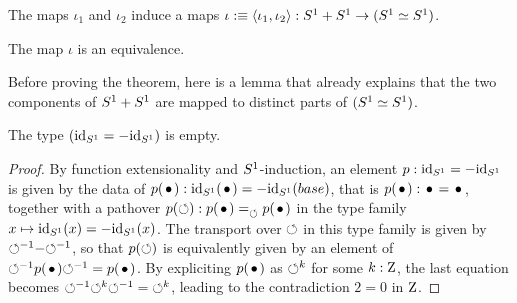 \documentclass[english,a4paper]{tufte-handout}
\begin{document}
The maps $\iota_1$ and $\iota_2$ induce a maps
$\iota \mathrel{\hbox{:}\mkern-5mu\equiv} \langle\iota_1,\iota_2\rangle : {S^1} + {S^1} \to ({S^1}\simeq
{S^1})$.
\begin{theorem*}
  The map $\iota$ is an equivalence.
\end{theorem*}
%
Before proving the theorem, here is a lemma that already explains that
the two components of ${S^1}+{S^1}$ are mapped to distinct parts of
$({S^1} \simeq {S^1})$.
\begin{lemma}
  \label{lemma:id-not-equal-oppid}%
  The type $(\mathord{\mathrm{id}}_{S^1} = -\mathord{\mathrm{id}}_{S^1})$ is empty.
\end{lemma}
\begin{proof}
  By function extensionality and ${S^1}$-induction, an element
  $p : \mathord{\mathrm{id}}_{S^1} = -\mathord{\mathrm{id}}_{S^1}$ is given by the data of
  $p(\base) : \id_\Sc(\base) = -\id_\Sc(base)$, that is
  $p(\base):\base=\base$, together with a pathover
  $p(\Sloop): \pathover {p(\base)} {} \Sloop {p(\base)}$ in the type
  family $x\mapsto \mathord{\mathrm{id}}_{S^1} (x)=-\mathord{\mathrm{id}}_{S^1} (x)$. The transport over
  $\mathord{\circlearrowleft}$ in this type family is given by
  ${\mathord{\circlearrowleft}}^{-1}\mathord{-}{\mathord{\circlearrowleft}}^{-1}$, so that $p(\mathord{\circlearrowleft})$ is equivalently
  given by an element of $\inv\Sloop p(\base) \inv\Sloop =
  p(\base)$. By expliciting $p(\base)$ as $\mathord{\circlearrowleft}^k$ for some
  $k:\mathrm{Z}$, the last equation becomes
  ${\mathord{\circlearrowleft}}^{-1} \mathord{\circlearrowleft}^k {\mathord{\circlearrowleft}}^{-1} = \mathord{\circlearrowleft}^k$, leading to the
  contradiction $2=0$ in $\mathrm{Z}$.
\end{proof}
\end{document}
